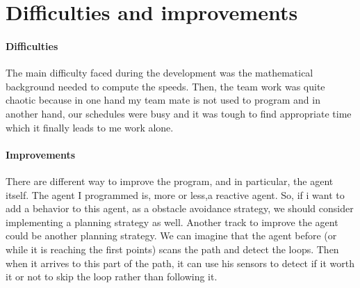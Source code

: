 \section{Difficulties and improvements}

\paragraph{Difficulties}{
    The main difficulty faced during the development was the mathematical
 background needed to compute the speeds. Then, the team work was quite chaotic
 because in one hand my team mate is not used to program and in another hand,
 our schedules were busy and it was tough to find appropriate time which it
 finally leads to me work alone.
}

\paragraph{Improvements}{
    There are different way to improve the program, and in particular, the
 agent itself. The agent I programmed is, more or less,a reactive agent. So,
 if i want to add a behavior to this agent, as a obstacle avoidance strategy,
 we should consider implementing a planning strategy as well. \newline
 Another track to improve the agent could be another planning strategy. We can
 imagine that the agent before (or while it is reaching the first points) scans
 the path and detect the loops. Then when it arrives to this part of the path,
 it can use his sensors to detect if it worth it or not to skip the loop rather
 than following it.
}
